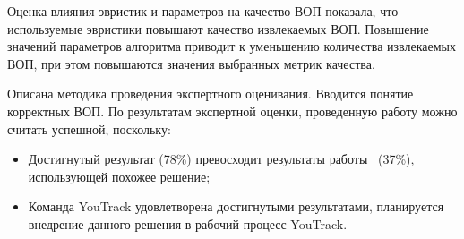 Оценка влияния эвристик и параметров на качество ВОП показала, что используемые эвристики повышают качество извлекаемых ВОП. Повышение значений параметров алгоритма приводит к уменьшению количества извлекаемых ВОП, при этом повышаются значения выбранных метрик качества.

Описана методика проведения экспертного оценивания. Вводится понятие корректных ВОП. По результатам экспертной оценки, проведенную работу можно считать успешной, поскольку:

\begin{itemize}
\item Достигнутый результат (78\%) превосходит результаты работы~\cite{original} (37\%), использующей похожее решение;
\item Команда YouTrack удовлетворена достигнутыми результатами, планируется внедрение данного решения в рабочий процесс YouTrack.
\end{itemize}